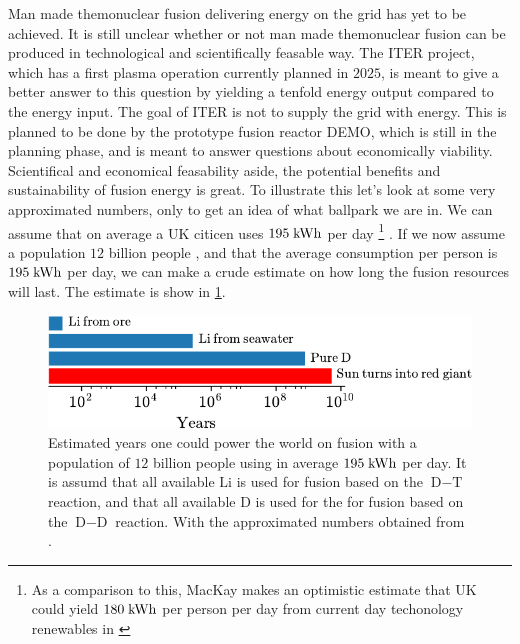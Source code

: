Man made themonuclear fusion delivering energy on the grid has yet to be achieved.
It is still unclear whether or not man made themonuclear fusion can be produced in technological and scientifically feasable way.
The ITER \cite{ITERWeb} project, which has a first plasma operation currently planned in $2025$, is meant to give a better answer to this question by yielding a tenfold energy output compared to the energy input.
The goal of ITER is not to supply the grid with energy.
This is planned to be done by the prototype fusion reactor DEMO, which is still in the planning phase, and is meant to answer questions about economically viability.
Scientifical and economical feasability aside, the potential benefits and sustainability of fusion energy is great.
To illustrate this let's look at some very approximated numbers, only to get an idea of what ballpark we are in.
We can assume that on average a UK citicen uses $195 \text{\;kWh}$ per day%
\footnote{As a comparison to this, MacKay makes an optimistic estimate that UK could yield $180 \text{\;kWh}$ per person per day from current day techonology renewables in \cite{Mackay2009book}}%
%
\cite{Mackay2009book}.
If we now assume a population $12$ billion people \cite{Melorose2015}, and that the average consumption per person is $195 \text{\;kWh}$ per day, we can make a crude estimate on how long the fusion resources will last.
The estimate is show in \cref{fig:potFusion}.
%
\begin{figure}[htb]
    \begin{center}
        \includegraphics{fig/intro/fusionSustain}
    \end{center}
    \caption{Estimated years one could power the world on fusion with a population of $12$ billion people using in average $195 \text{\;kWh}$ per day.
        It is assumd that all available $\text{Li}$ is used for fusion based on the $\text{D}-\text{T}$ reaction, and that all available $\text{D}$ is used for the for fusion based on the $\text{D}-\text{D}$ reaction.
        With the approximated numbers obtained from \cite{Melorose2015,Mackay2009book,ongena2012,Eckhartt1995}.}
    \label{fig:potFusion}
\end{figure}


